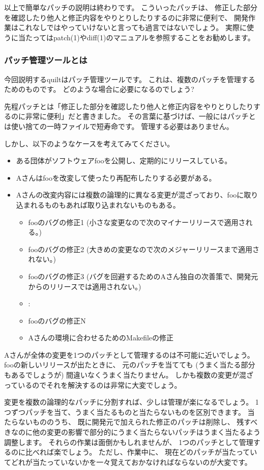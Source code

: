 \documentclass[mingoth,a4paper]{jsarticle}
\begin{document}
以上で簡単なパッチの説明は終わりです。
こういったパッチは、
修正した部分を確認したり他人と修正内容をやりとりしたりするのに非常に便利で、
開発作業はこれなしではやっていけないと言っても過言ではないでしょう。
実際に使うに当たってはpatch(1)やdiff(1)のマニュアルを参照することをお勧めします。

\subsubsection{パッチ管理ツールとは}

今回説明するquiltはパッチ管理ツールです。
これは、複数のパッチを管理するためのものです。
どのような場合に必要になるのでしょう?

先程パッチとは「修正した部分を確認したり他人と修正内容をやりとりしたりするのに非常に便利」だと書きました。
その言葉に基づけば、一般にはパッチとは使い捨ての一時ファイルで短寿命です。
管理する必要はありません。

しかし、以下のようなケースを考えてみてください。
\begin{itemize}
 \item ある団体がソフトウェアfooを公開し、定期的にリリースしている。
 \item Aさんはfooを改変して使ったり再配布したりする必要がある。
 \item Aさんの改変内容には複数の論理的に異なる変更が混ざっており、fooに取り込まれるものもあれば取り込まれないものもある。
\begin{itemize}
 \item fooのバグの修正1 (小さな変更なので次のマイナーリリースで適用される。)
 \item fooのバグの修正2 (大きめの変更なので次のメジャーリリースまで適用されない。)
 \item fooのバグの修正3 (バグを回避するためのAさん独自の次善策で、開発元からのリリースでは適用されない。)
 \item :
 \item fooのバグの修正N
 \item Aさんの環境に合わせるためのMakefileの修正
\end{itemize}
\end{itemize}

Aさんが全体の変更を1つのパッチとして管理するのは不可能に近いでしょう。
fooの新しいリリースが出たときに、
元のパッチを当てても (うまく当たる部分もあるでしょうが) 間違いなくうまく当たりません。
しかも複数の変更が混ざっているのでそれを解決するのは非常に大変でしょう。

変更を複数の論理的なパッチに分割すれば、少しは管理が楽になるでしょう。
1つずつパッチを当て、うまく当たるものと当たらないものを区別できます。
当たらないもののうち、
既に開発元で加えられた修正のパッチは削除し、
残すべきなのに他の変更の影響で部分的にうまく当たらないパッチはうまく当たるよう調整します。
それらの作業は面倒かもしれませんが、
1つのパッチとして管理するのに比べれば楽でしょう。
ただし、作業中に、
現在どのパッチが当たっていてどれが当たっていないかを一々覚えておかなければならないのが大変です。
\end{document}
